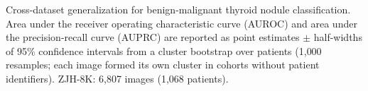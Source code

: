 \begin{table}[p]
\centering
\begin{threeparttable}

\caption{Cross-dataset generalization for benign-malignant thyroid nodule classification. Area under the receiver operating characteristic curve (AUROC) and area under the precision-recall curve (AUPRC) are reported as point estimates $\pm$ half-widths of 95\% confidence intervals from a cluster bootstrap over patients (1{,}000 resamples; each image formed its own cluster in cohorts without patient identifiers). ZJH-8K: 6{,}807 images (1{,}068 patients).}
\label{tab:cls_performance}

\footnotesize
\setlength{\tabcolsep}{5.5pt}
\renewcommand{\arraystretch}{1.08}


\end{threeparttable}
\end{table}
